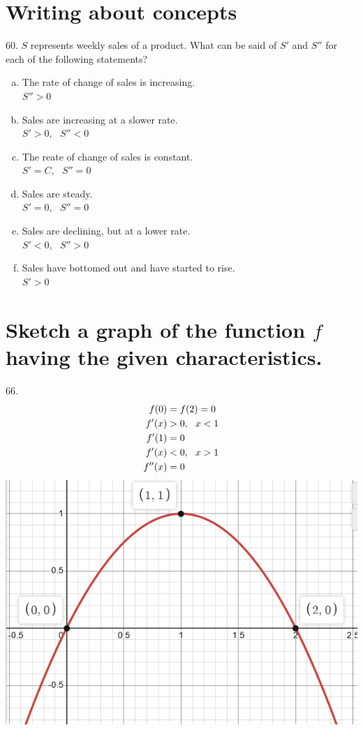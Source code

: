 \documentclass[11pt]{article}
\newcommand*{\set}{\setcounter{equation}{0}}
\begin{document}
\section{Writing about concepts}
60. $S$ represents weekly sales of a product. What can be said of $S'$ and $S''$ for each of the following statements?
\begin{enumerate}[(a)]
    \item The rate of change of sales is increasing.\\ \indent $S''>0$
    \item Sales are increasing at a slower rate.\\ \indent $S'>0,\,\,\,\, S''<0$
    \item The reate of change of sales is constant.\\ \indent $S'=C,\,\,\,\, S''=0$
    \item Sales are steady.\\ \indent $S'=0,\,\,\,\, S''=0$
    \item Sales are declining, but at a lower rate.\\ \indent $S'<0,\,\,\,\, S''>0$
    \item Sales have bottomed out and have started to rise.\\ \indent $S'>0$
\end{enumerate}

\section{Sketch a graph of the function $f$ having the given characteristics.}
66.\begin{align}
    \set
    f(0)&=f(2)=0\\
    f'(x)&>0,\,\,\,\, x<1\\
    f'(1)&=0\\
    f'(x)&<0,\,\,\,\, x>1\\
    f''(x)&=0
\end{align}
\includegraphics[scale=0.5]{66.png}\\
\end{document}
